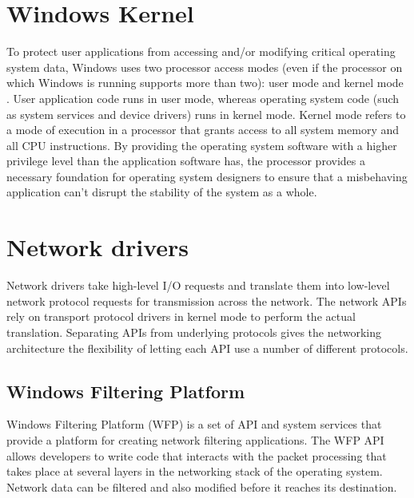 \vspace{5mm}
\section{Windows Kernel}
\vspace{5mm}

To protect user applications from accessing and/or modifying critical operating system data, Windows
uses two processor access modes (even if the processor on which Windows is running supports more
than two): user mode and kernel mode \cite{BOOK:1} . User application code runs in user mode, whereas operating
system code (such as system services and device drivers) runs in kernel mode. Kernel mode refers to
a mode of execution in a processor that grants access to all system memory and all CPU instructions.
By providing the operating system software with a higher privilege level than the application software
has, the processor provides a necessary foundation for operating system designers to ensure that a
misbehaving application can’t disrupt the stability of the system as a whole.

\vspace{5mm}
\section{Network drivers}
\vspace{5mm}

Network drivers take high-level I/O requests and translate them into low-level network protocol
requests for transmission across the network. The network APIs rely on transport protocol drivers in
kernel mode to perform the actual translation. Separating APIs from underlying protocols gives the
networking architecture the flexibility of letting each API use a number of different protocols.

\vspace{5mm}
\subsection{Windows Filtering Platform}
\vspace{5mm}

Windows Filtering Platform (WFP) is a set of API and system services that provide a platform for creating network filtering applications. The WFP API allows developers to write code that interacts with the packet processing that takes place at several layers in the networking stack of the operating system. Network data can be filtered and also modified before it reaches its destination.

